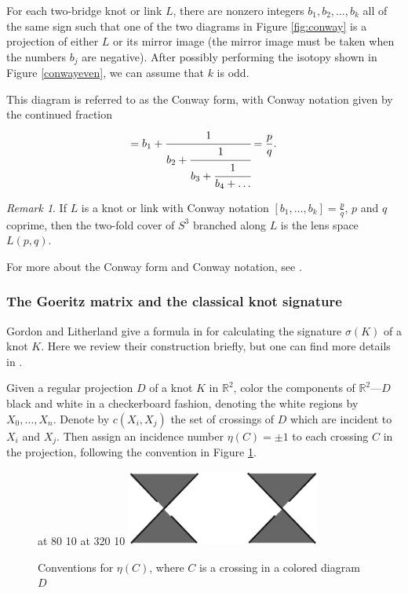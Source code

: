 \documentclass[11pt]{article}
\theoremstyle{plain} \newtheorem{thm}{Theorem}[subsection]
\theoremstyle{plain} \newtheorem{cor}[thm]{Corollary}
\theoremstyle{plain} \newtheorem{prop}[thm]{Proposition}
\theoremstyle{plain} \newtheorem{conj}[thm]{Conjecture}
\theoremstyle{plain} \newtheorem{lem}[thm]{Lemma}
\theoremstyle{definition} \newtheorem{df}[thm]{Definition}
\theoremstyle{remark} \newtheorem{rmk}[thm]{Remark}
\theoremstyle{remark} \newtheorem{obs}[thm]{Observation}
\numberwithin{equation}{section}
\begin{document}
For each two-bridge knot or link $L$, there are nonzero integers $b_{1}, b_{2}, \ldots ,b_{k}$ all of the same sign such that one of the two diagrams in Figure \ref{fig:conway} is a projection of either $L$ or its mirror image (the mirror image must be taken when the numbers $b_j$ are negative).  After possibly performing the isotopy shown in Figure \ref{conwayeven}, we can assume that $k$ is odd.

This diagram is referred to as the Conway form, with Conway notation given by the continued fraction
\begin{equation*}
[b_{1}, \ldots, b_{k}] = b_{1} + \cfrac{1}{b_{2} + \cfrac{1}{b_{3} + \cfrac{1}{b_{4} + \ldots}}} = \frac{p}{q}.
\end{equation*}
\begin{rmk}
If $L$ is a knot or link with Conway notation $[b_{1}, \ldots, b_{k}]  = \frac{p}{q}$, $p$ and $q$ coprime, 
then the two-fold cover of $S^{3}$ branched along $L$ is the lens space $L(p,q)$.
\end{rmk}

For more about the Conway form and Conway notation, see \cite{rolf:knots}.

\subsubsection{The Goeritz matrix and the classical knot signature}

Gordon and Litherland give a formula in \cite{gl:sig} for calculating the signature $\sigma(K)$ of a knot $K$.  Here we review their construction briefly, but one can  find more details in \cite{gl:sig}.

Given a regular projection $D$ of a knot $K$ in $\mathbb{R}^2$, color  the components of $\mathbb{R}^2$---$D$ black and white in a checkerboard fashion, denoting the white regions by $X_{0}, \ldots, X_{n}$.  Denote by $c(X_{i},X_{j})$ the set of crossings of $D$ which are incident to $X_{i}$ and $X_{j}$.  Then assign an incidence number $\eta(C) = \pm 1$ to each crossing $C$ in the projection, following the convention in Figure \ref{fig:crossingeta}.

\begin{figure}[h]
\centering
\begin{minipage}[c]{.45\linewidth}
\small
{} at 80 10
 at 320 10
\endlabellist
\includegraphics[height = 25mm]{crossingeta}\end{minipage}
\begin{minipage}[c]{.45\linewidth}
\caption[Conventions for $\eta$ on crossings in colored diagrams]{Conventions for $\eta(C)$, where $C$ is a crossing in a colored diagram $D$}
\label{fig:crossingeta}
\end{minipage}
\end{figure}
\end{document}
